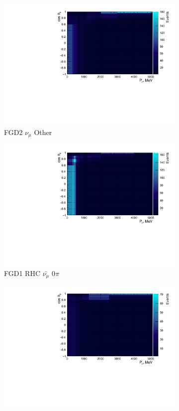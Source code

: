 \begin{figure}
\begin{subfigure}{.32\textwidth}
  \includegraphics[width=0.95\linewidth]{figs/NomMC_MC_FGD2_numuCC_other}
  \caption{FGD2 $\nu_{\mu}$ Other}
  \label{fig:2d_FGD2_numuCC_other}
\end{subfigure}
\centering
\begin{subfigure}{.32\textwidth}
  \centering
  \includegraphics[width=0.95\linewidth]{figs/NomMC_MC_FGD1_anti-numuCC_0pi}
  \caption{FGD1 RHC $\bar{\nu_{\mu}}$ 0$\pi$}
  \label{fig:2d_FGD1_anti-numuCC_0pi}
\end{subfigure}
\begin{subfigure}{.32\textwidth}
  \centering
  \includegraphics[width=0.95\linewidth]{figs/NomMC_MC_FGD1_anti-numuCC_1pi}

\end{subfigure}
\end{figure}
